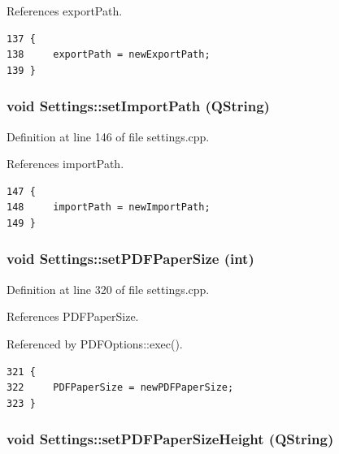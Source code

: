 References export\-Path.

\footnotesize\begin{verbatim}137 {
138     exportPath = newExportPath;
139 }
\end{verbatim}\normalsize 


\hypertarget{classSettings_a6}{
\subsubsection[setImportPath]{\setlength{\rightskip}{0pt plus 5cm}void Settings::set\-Import\-Path (QString)}}
\label{classSettings_a6}


Definition at line 146 of file settings.cpp.

References import\-Path.

\footnotesize\begin{verbatim}147 {
148     importPath = newImportPath;
149 }
\end{verbatim}\normalsize 


\hypertarget{classSettings_a39}{
\subsubsection[setPDFPaperSize]{\setlength{\rightskip}{0pt plus 5cm}void Settings::set\-PDFPaper\-Size (int)}}
\label{classSettings_a39}


Definition at line 320 of file settings.cpp.

References PDFPaper\-Size.

Referenced by PDFOptions::exec().

\footnotesize\begin{verbatim}321 {
322     PDFPaperSize = newPDFPaperSize;
323 }
\end{verbatim}\normalsize 


\hypertarget{classSettings_a43}{
\subsubsection[setPDFPaperSizeHeight]{\setlength{\rightskip}{0pt plus 5cm}void Settings::set\-PDFPaper\-Size\-Height (QString)}}
\label{classSettings_a43}


